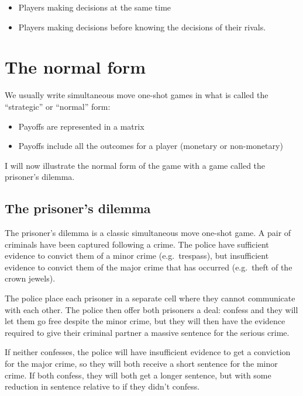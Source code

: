 \documentclass[
  letterpaper,
  DIV=11,
  numbers=noendperiod]{scrreprt}
\begin{document}
\begin{itemize}
\item
  Players making decisions at the same time
\item
  Players making decisions before knowing the decisions of their rivals.
\end{itemize}

\hypertarget{the-normal-form}{%
\section{The normal form}\label{the-normal-form}}

We usually write simultaneous move one-shot games in what is called the
``strategic'' or ``normal'' form:

\begin{itemize}
\item
  Payoffs are represented in a matrix
\item
  Payoffs include all the outcomes for a player (monetary or
  non-monetary)
\end{itemize}

I will now illustrate the normal form of the game with a game called the
prisoner's dilemma.

\hypertarget{the-prisoners-dilemma}{%
\subsection{The prisoner's dilemma}\label{the-prisoners-dilemma}}

The prisoner's dilemma is a classic simultaneous move one-shot game. A
pair of criminals have been captured following a crime. The police have
sufficient evidence to convict them of a minor crime (e.g.~trespass),
but insufficient evidence to convict them of the major crime that has
occurred (e.g.~theft of the crown jewels).

The police place each prisoner in a separate cell where they cannot
communicate with each other. The police then offer both prisoners a
deal: confess and they will let them go free despite the minor crime,
but they will then have the evidence required to give their criminal
partner a massive sentence for the serious crime.

If neither confesses, the police will have insufficient evidence to get
a conviction for the major crime, so they will both receive a short
sentence for the minor crime. If both confess, they will both get a
longer sentence, but with some reduction in sentence relative to if they
didn't confess.
\end{document}
